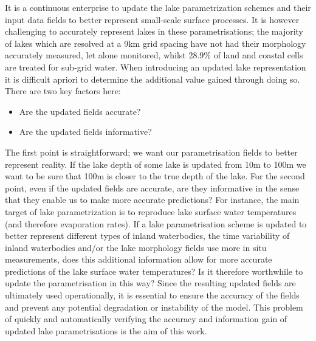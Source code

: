 \documentclass[twocolumn]{article}
\begin{document}
\noindent It is a continuous enterprise to update the lake parametrization schemes and their input data fields to better represent small-scale surface processes. It is however challenging to accurately represent lakes in these parametrisations; the majority of lakes which are resolved at a 9km grid spacing have not had their morphology accurately measured, let alone monitored, whilst 28.9$\%$ of land and coastal cells are treated for sub-grid water. When introducing an updated lake representation it is difficult apriori to determine the additional value gained through doing so. There are two key factors here:
\begin{itemize}
	\item Are the updated fields accurate?
	\item Are the updated fields informative?
\end{itemize}
The first point is straightforward; we want our parametrisation fields to better represent reality. If the lake depth of some lake is updated from 10m to 100m we want to be sure that 100m is closer to the true depth of the lake. For the second point, even if the updated fields are accurate, are they informative in the sense that they enable us to make more accurate predictions? For instance, the main target of lake parametrization is to reproduce lake surface water temperatures (and therefore evaporation rates). If a lake parametrisation scheme is updated to better represent different types of inland waterbodies, the time variability of inland waterbodies and/or the lake morphology fields use more in situ measurements, does this additional information allow for more accurate predictions of the lake surface water temperatures? Is it therefore worthwhile to update the parametrisation in this way? Since the resulting updated fields are ultimately used operationally, it is essential to ensure the accuracy of the fields and prevent any potential degradation or instability of the model. This problem of quickly and automatically verifying the accuracy and information gain of updated lake parametrisations is the aim of this work. \newline
\end{document}
